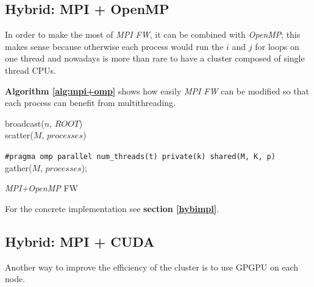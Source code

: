 \subsection{Hybrid: MPI + OpenMP}
In order to make the most of \emph{MPI FW}, it can be combined with \emph{OpenMP}; this
makes sense because otherwise each process would run the $i$ and $j$ for loops on one thread and nowadays
is more than rare to have a cluster composed of single thread CPUs.

\textbf{Algorithm \ref*{alg:mpi+omp}} shows how easily \emph{MPI FW} can be modified
so that each process can benefit from multithreading.
\begin{algorithm}[h!]

\SetAlgoLined

broadcast($n$, $ROOT$) \\
scatter($M$, $processes$)

\texttt{\#pragma omp parallel num\_threads(t) private(k) shared(M, K, p)} \\
gather($M$, $processes$);
 
\caption{\emph{MPI+OpenMP} FW}\label{alg:mpi+omp}
\end{algorithm}

For the concrete implementation see \textbf{section \ref{hybimpl}}.










\subsection{Hybrid: MPI + CUDA}
Another way to improve the efficiency of the cluster is to 
use GPGPU on each node.

